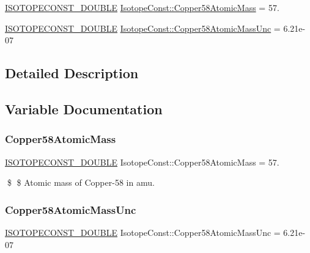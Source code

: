 \begin{DoxyCompactItemize}
\item 
\mbox{\hyperlink{group___isotope_const-_macros_ga8f45a7272ce02c0b4c65c44636ed719a}{I\+S\+O\+T\+O\+P\+E\+C\+O\+N\+S\+T\+\_\+\+D\+O\+U\+B\+LE}} \mbox{\hyperlink{group___isotope_const-_copper-_cu58_ga72a9ad4180b35b949345761d2ade9abb}{Isotope\+Const\+::\+Copper58\+Atomic\+Mass}} = 57.
\item 
\mbox{\hyperlink{group___isotope_const-_macros_ga8f45a7272ce02c0b4c65c44636ed719a}{I\+S\+O\+T\+O\+P\+E\+C\+O\+N\+S\+T\+\_\+\+D\+O\+U\+B\+LE}} \mbox{\hyperlink{group___isotope_const-_copper-_cu58_ga4141c2e4a7f263b947ac73a25cc42ca6}{Isotope\+Const\+::\+Copper58\+Atomic\+Mass\+Unc}} = 6.\+21e-\/07
\end{DoxyCompactItemize}


\subsection{Detailed Description}


\subsection{Variable Documentation}
\mbox{\label{group___isotope_const-_copper-_cu58_ga72a9ad4180b35b949345761d2ade9abb}} 
\subsubsection{\texorpdfstring{Copper58\+Atomic\+Mass}{Copper58AtomicMass}}
{\footnotesize\ttfamily \mbox{\hyperlink{group___isotope_const-_macros_ga8f45a7272ce02c0b4c65c44636ed719a}{I\+S\+O\+T\+O\+P\+E\+C\+O\+N\+S\+T\+\_\+\+D\+O\+U\+B\+LE}} Isotope\+Const\+::\+Copper58\+Atomic\+Mass = 57.}

\$ \$ Atomic mass of Copper-\/58 in amu. \mbox{\label{group___isotope_const-_copper-_cu58_ga4141c2e4a7f263b947ac73a25cc42ca6}} 
\subsubsection{\texorpdfstring{Copper58\+Atomic\+Mass\+Unc}{Copper58AtomicMassUnc}}
{\footnotesize\ttfamily \mbox{\hyperlink{group___isotope_const-_macros_ga8f45a7272ce02c0b4c65c44636ed719a}{I\+S\+O\+T\+O\+P\+E\+C\+O\+N\+S\+T\+\_\+\+D\+O\+U\+B\+LE}} Isotope\+Const\+::\+Copper58\+Atomic\+Mass\+Unc = 6.\+21e-\/07}

